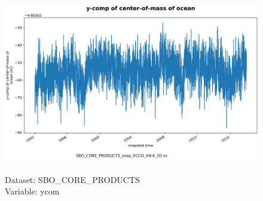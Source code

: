 \begin{figure}[H]
\centering
\includegraphics[scale=0.5]{../images/plots/oneD_plots/SBO_Core_Products/ycom.png}
\caption{\\Dataset: SBO\_CORE\_PRODUCTS\\Variable: ycom}
\label{tab:table-SBO_CORE_PRODUCTS_ycom-Plot}
\end{figure}
\pagebreak
